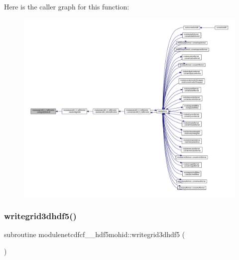 Here is the caller graph for this function\+:\nopagebreak
\begin{figure}[H]
\begin{center}
\leavevmode
\includegraphics[width=350pt]{namespacemodulenetcdfcf__2__hdf5mohid_ae7c9e3dcc5e862ce4bcb8836b9f03f77_icgraph}
\end{center}
\end{figure}
\mbox{\label{namespacemodulenetcdfcf__2__hdf5mohid_ab6beeef80ab10e31564937dcd13306eb}} 
\subsubsection{\texorpdfstring{writegrid3dhdf5()}{writegrid3dhdf5()}}
{\footnotesize\ttfamily subroutine modulenetcdfcf\+\_\+\_\+hdf5mohid\+::writegrid3dhdf5 (\begin{DoxyParamCaption}{ }\end{DoxyParamCaption})\hspace{0.3cm}{\ttfamily [private]}}

